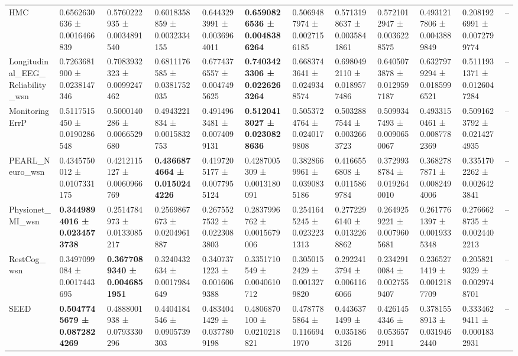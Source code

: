 \begin{table}[htbp]
\begin{tabular}{llllllllllll}
HMC & 0.6562630636 ± 0.0016466839 & 0.5760222935 ± 0.0034891540 & 0.6018358859 ± 0.0032334155 & 0.6443293991 ± 0.0036964011 & \bfseries 0.6590826536 ± 0.0048386264 & 0.5069487974 ± 0.0027156185 & 0.5713198637 ± 0.0035841861 & 0.5721012947 ± 0.0036228575 & 0.4931217806 ± 0.0043889849 & 0.2081926991 ± 0.0072799774 & -- \\
Longitudinal_EEG_Reliability_wsn & 0.7263681900 ± 0.0238147346 & 0.7083932323 ± 0.0099247462 & 0.6811176585 ± 0.0381752035 & 0.6774376557 ± 0.0047495625 & \bfseries 0.7403423306 ± 0.0226263264 & 0.6683743641 ± 0.0249348574 & 0.6980492110 ± 0.0189577486 & 0.6405073878 ± 0.0129597187 & 0.6327979294 ± 0.0185996521 & 0.5111931371 ± 0.0126047284 & -- \\
MonitoringErrP & 0.5117515450 ± 0.0190286548 & 0.5000140286 ± 0.0066529680 & 0.4943221834 ± 0.0015832753 & 0.4914963481 ± 0.0074099131 & \bfseries 0.5120413027 ± 0.0230828636 & 0.5053724764 ± 0.0240179808 & 0.5032887544 ± 0.0032663723 & 0.5099347493 ± 0.0090650067 & 0.4933150461 ± 0.0087782369 & 0.5091623792 ± 0.0214274935 & -- \\
PEARL_Neuro_wsn & 0.4345750012 ± 0.0107331175 & 0.4212115127 ± 0.0060966769 & \bfseries 0.4366874664 ± 0.0150244226 & 0.4197205177 ± 0.0077955124 & 0.4287005309 ± 0.0013180091 & 0.3828669961 ± 0.0390835186 & 0.4166556808 ± 0.0115869784 & 0.3729938784 ± 0.0192640010 & 0.3682787871 ± 0.0082494006 & 0.3351702262 ± 0.0026423841 & -- \\
Physionet_MI_wsn & \bfseries 0.3449894016 ± 0.0234573738 & 0.2514784973 ± 0.0133085217 & 0.2569867673 ± 0.0204961887 & 0.2675527532 ± 0.0223083803 & 0.2837996762 ± 0.0015679006 & 0.2541645245 ± 0.0232231313 & 0.2772296140 ± 0.0132268862 & 0.2649259221 ± 0.0079605681 & 0.2617761397 ± 0.0019335348 & 0.2766628735 ± 0.0024402213 & -- \\
RestCog_wsn & 0.3497099084 ± 0.0017443695 & \bfseries 0.3677089340 ± 0.0046851951 & 0.3240432634 ± 0.0017984649 & 0.3407371223 ± 0.0016069388 & 0.3351710549 ± 0.0040610712 & 0.3050152429 ± 0.0013279820 & 0.2922413794 ± 0.0061166066 & 0.2342910084 ± 0.0027559407 & 0.2365271419 ± 0.0012187709 & 0.2058219329 ± 0.0029748701 & -- \\
SEED & \bfseries 0.5047745679 ± 0.0872824269 & 0.4888001938 ± 0.0793330296 & 0.4404184546 ± 0.0905739303 & 0.4834041429 ± 0.0377809198 & 0.4806870100 ± 0.0210218821 & 0.4787785864 ± 0.1166941970 & 0.4436371499 ± 0.0351863126 & 0.4261454346 ± 0.0536572911 & 0.3781558913 ± 0.0319462440 & 0.3334629411 ± 0.0001832931 & -- \\

\end{tabular}
\end{table}
